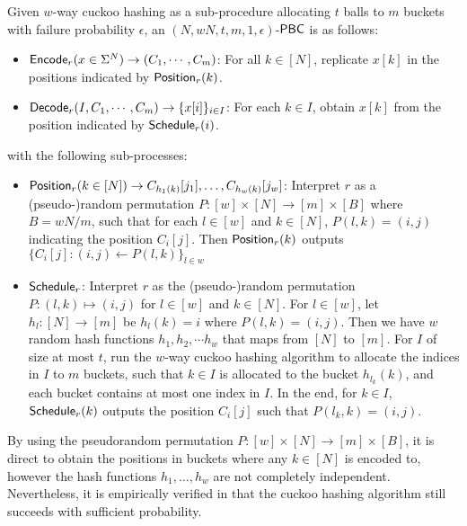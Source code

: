 \begin{construction}\label{con:PBC_from_cuckoo}
  Given $w$-way cuckoo hashing as a sub-procedure allocating $t$ balls to $m$ buckets with failure probability $\epsilon$, an $(N,wN,t,m,1,\epsilon)$-${\sf PBC}$ is as follows: 
  \begin{itemize}
    \item ${\sf Encode}_r(x\in\Sigma^N)\rightarrow (C_1,\cdots,C_m)$: For all $k\in[N]$, replicate $x[k]$ in the positions indicated by ${\sf Position}_r(k)$. %
    \item ${\sf Decode}_r(I, C_1,\cdots, C_m)\rightarrow \{x[i]\}_{i\in I}$: For each $k\in I$, obtain $x[k]$ from the position indicated by ${\sf Schedule}_r(i)$. 
  \end{itemize}
  with the following sub-processes: 
  \begin{itemize}
    \item ${\sf Position}_r(k\in[N])\rightarrow C_{h_1(k)}[j_1],\dots,C_{h_w(k)}[j_w]$: Interpret $r$ as a (pseudo-)random permutation $P:[w]\times [N]\rightarrow [m]\times [B]$ where $B = wN/m$, such that for each $l\in[w]$ and $k\in[N]$, $P(l,k) = (i,j)$ indicating the position $C_i[j]$. Then ${\sf Position}_r(k)$ outputs $\{C_i[j]: (i,j)\gets P(l,k)\}_{l\in w}$
    \item ${\sf Schedule}_r$: Interpret $r$ as the (pseudo-)random permutation $P:(l,k)\mapsto (i,j)$ for $l\in[w]$ and $k\in[N]$. For $l\in[w]$, let $h_l:[N]\rightarrow [m]$ be $h_l(k) = i$ where $P(l,k) = (i,j)$. Then we have $w$ random hash functions $h_1,h_2,\cdots h_w$ that maps from $[N]$ to $[m]$.
    For $I$ of size at most $t$, run the $w$-way cuckoo hashing algorithm to allocate the indices in $I$ to $m$ buckets, such that $k\in I$ is allocated to the bucket $h_{l_k}(k)$, and each bucket contains at most one index in $I$. In the end, for $k\in I$, ${\sf Schedule}_r(k)$ outputs the position $C_i[j]$ such that $P(l_k,k) = (i,j)$. 
  \end{itemize}
\end{construction}
\begin{remark}
    By using the pseudorandom permutation $P:[w]\times [N]\rightarrow [m]\times [B]$, it is direct to obtain the positions in buckets where any $k\in[N]$ is encoded to, however the hash functions $h_1,\dots,h_w$ are not completely independent. Nevertheless, it is empirically verified in \cite{cryptoeprint:2021/580} that the cuckoo hashing algorithm still succeeds with sufficient probability. 
\end{remark}
